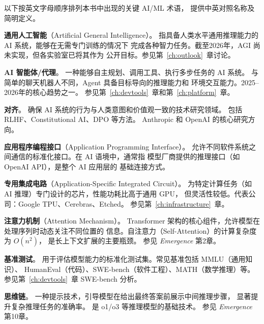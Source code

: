 以下按英文字母顺序排列本书中出现的关键 AI/ML 术语，
提供中英对照名称及简明定义。

\bigskip

\begin{description}[style=nextline, leftmargin=2.5cm, labelwidth=2.3cm, font=\bfseries]

\item[AGI]
\textbf{通用人工智能}（Artificial General Intelligence）。
指具备人类水平通用推理能力的 AI 系统，能够在无需专门训练的情况下
完成各种智力任务。截至2026年，AGI 尚未实现，但各实验室已将其作为
公开目标。参见第~\ref{ch:outlook}~章讨论。

\item[Agent]
\textbf{AI 智能体/代理}。
一种能够自主规划、调用工具、执行多步任务的 AI 系统。
与简单的聊天机器人不同，Agent 具备目标导向的推理能力和
环境交互能力。2025--2026年的核心趋势之一。
参见第~\ref{ch:devtools}~章和第~\ref{ch:platform}~章。

\item[Alignment]
\textbf{对齐}。
确保 AI 系统的行为与人类意图和价值观一致的技术研究领域。
包括 RLHF、Constitutional AI、DPO 等方法。
Anthropic 和 OpenAI 的核心研究方向。

\item[API]
\textbf{应用程序编程接口}（Application Programming Interface）。
允许不同软件系统之间通信的标准化接口。在 AI 语境中，通常指
模型厂商提供的推理接口（如 OpenAI API），是整个 AI 应用层的
基础连接方式。

\item[ASIC]
\textbf{专用集成电路}（Application-Specific Integrated Circuit）。
为特定计算任务（如 AI 推理）专门设计的芯片，性能功耗比高于通用 GPU，
但灵活性较低。代表公司：Google TPU、Cerebras、Etched。
参见第~\ref{ch:infrastructure}~章。

\item[Attention]
\textbf{注意力机制}（Attention Mechanism）。
Transformer 架构的核心组件，允许模型在处理序列时动态关注不同位置的
信息。自注意力（Self-Attention）的计算复杂度为 $O(n^2)$，
是长上下文扩展的主要瓶颈。
参见 \textit{Emergence} 第2章。

\item[Benchmark]
\textbf{基准测试}。
用于评估模型能力的标准化测试集。常见基准包括 MMLU（通用知识）、
HumanEval（代码）、SWE-bench（软件工程）、MATH（数学推理）等。
参见第~\ref{ch:devtools}~章 SWE-bench 分析。

\item[Chain-of-Thought (CoT)]
\textbf{思维链}。
一种提示技术，引导模型在给出最终答案前展示中间推理步骤，
显著提升复杂推理任务的准确率。
是 o1/o3 等推理模型的基础技术。
参见 \textit{Emergence} 第10章。


\end{description}
